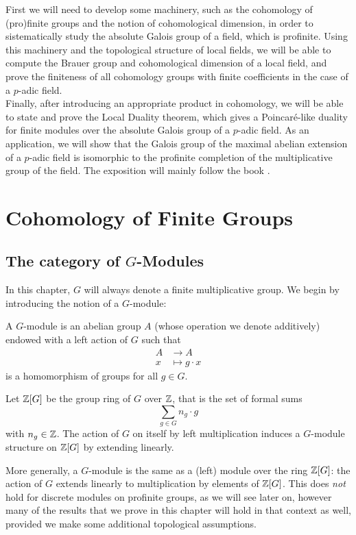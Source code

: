 \documentclass[a4paper, oneside]{memoir}
\begin{document}
First we will need to develop some machinery, such as the cohomology of (pro)finite groups and the notion of cohomological dimension, in order to sistematically study the absolute Galois group of
a field, which is profinite. Using this machinery and the topological structure of local fields, we will be able to compute the Brauer group and cohomological dimension of a local field, and prove the
finiteness of all cohomology groups with finite coefficients in the case of a $p$-adic field.\\

Finally, after introducing an appropriate product in cohomology, we will be able to state and prove the Local Duality theorem, which gives a Poincaré-like duality for finite modules over the
absolute Galois group of a $p$-adic field. As an application, we will show that the Galois group of the maximal abelian extension of a $p$-adic field is isomorphic to the profinite
completion of the multiplicative group of the field. The exposition will mainly follow the book \cite{Harari}.


\chapter{Cohomology of Finite Groups}

\section{\texorpdfstring{The category of $G$-Modules}{The category of G-Modules}}

In this chapter, $G$ will always denote a finite multiplicative group. We begin by introducing the notion of a $G$-module:

\begin{definition}
	A $G$-module is an abelian group $A$ (whose operation we denote additively) endowed with a left action of $G$ such that
	\begin{align*}
		A & \longrightarrow A    \\
		x & \longmapsto g\cdot x
	\end{align*}
	is a homomorphism of groups for all $g\in G$.
\end{definition}

\begin{remark}
	Let $\mathbb{Z}[G]$ be the group ring of $G$ over $\mathbb{Z}$, that is the set of formal sums
	\[
		\sum_{g\in G}{n_g\cdot g}
	\]
	with $n_g\in\mathbb{Z}$. The action of $G$ on itself by left multiplication induces a $G$-module structure on $\mathbb{Z}[G]$ by extending linearly.

	More generally, a $G$-module is the same as a (left) module over the ring $\mathbb{Z}[G]$: the action of $G$ extends linearly to multiplication by elements of $\mathbb{Z}[G]$. This does \textit{not} hold for discrete modules on profinite groups, as we will see later on, however many of the results that we prove in this chapter will hold in that context as well, provided we make some additional topological assumptions.
\end{remark}
\end{document}

